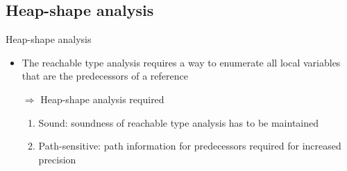 \documentclass{beamer}
\begin{document}
\subsection{Heap-shape analysis}
\begin{frame}{Heap-shape analysis}
\begin{itemize}
    \item The reachable type analysis requires a way to enumerate all local variables that are the predecessors of a reference
    \item[$\Rightarrow$] Heap-shape analysis required
    \begin{enumerate}
        \item Sound: soundness of reachable type analysis has to be maintained
        \item Path-sensitive: path information for predecessors required for increased precision
    \end{enumerate}
\end{itemize}
\end{frame}
\end{document}

